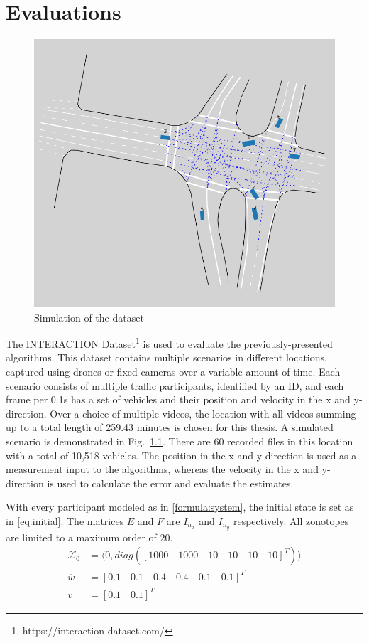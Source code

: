 \chapter{Evaluations} \label{ch:result}
\begin{figure}[H]
\centering
\includegraphics[width=0.5\linewidth,scale=0.25]{figures/dataset}
\caption{Simulation of the dataset}
\label{fig:dataset}
\end{figure}
The INTERACTION Dataset\footnote{https://interaction-dataset.com/} is used to evaluate the previously-presented algorithms. This dataset contains multiple scenarios in different locations, captured using drones or fixed cameras over a variable amount of time. Each scenario consists of multiple traffic participants, identified by an ID, and each frame per 0.1s has a set of vehicles and their position and velocity in the x and y-direction. Over a choice of multiple videos, the location with all videos summing up to a total length of 259.43 minutes is chosen for this thesis. A simulated scenario is demonstrated in Fig.~\ref{fig:dataset}. There are 60 recorded files in this location with a total of 10,518 vehicles. The position in the x and y-direction is used as a measurement input to the algorithms, whereas the velocity in the x and y-direction is used to calculate the error and evaluate the estimates. 

With every participant modeled as in \eqref{formula:system}, the initial state is set as in \eqref{eq:initial}. The matrices $E$ and $F$ are $I_{n_x}$ and $I_{n_y}$ respectively. All zonotopes are limited to a maximum order of $20$. 
\begin{equation}
\label{eq:initial}
\begin{split}
\mathcal{X}_0 &= \langle 0, diag([1000\quad 1000\quad 10 \quad10\quad 10\quad 10]^T) \rangle\\
\overline{w} &= [0.1\quad 0.1\quad 0.4\quad 0.4\quad 0.1\quad 0.1]^T\\
\overline{v} &= [0.1\quad 0.1]^T
\end{split}
\end{equation}


